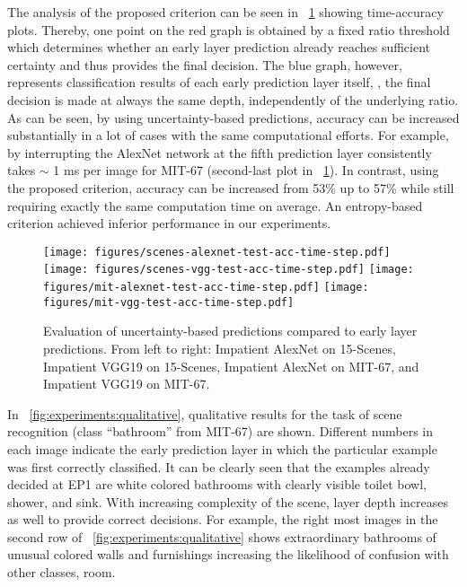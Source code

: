 \documentclass{bmvc2k}
\begin{document}
    The analysis of the proposed criterion can be seen in \figurename~\ref{fig:experiments:entropy} showing time-accuracy plots.
    Thereby, one point on the red graph is obtained by a fixed ratio threshold which determines whether an early layer prediction already reaches sufficient certainty and thus provides the final decision.
    The blue graph, however, represents classification results of each early prediction layer itself, \ie, the final decision is made at always the same depth, independently of the underlying ratio.
    As can be seen, by using uncertainty-based predictions, accuracy can be increased substantially in a lot of cases with the same computational efforts.
    For example, by interrupting the AlexNet network at the fifth prediction layer consistently takes $\sim$ 1 ms per image for MIT-67 (second-last plot in \figurename~\ref{fig:experiments:entropy}).
    In contrast, using the proposed criterion, accuracy can be increased from 53\% up to 57\% while still requiring exactly the same computation time on average.
    An entropy-based criterion achieved inferior performance in our experiments.
    
    \begin{figure}[tb]
        \centering
        \texttt{[image: figures/scenes-alexnet-test-acc-time-step.pdf]}
        \texttt{[image: figures/scenes-vgg-test-acc-time-step.pdf]} 
        \texttt{[image: figures/mit-alexnet-test-acc-time-step.pdf]}
        \texttt{[image: figures/mit-vgg-test-acc-time-step.pdf]} 
        \caption{
            Evaluation of uncertainty-based predictions compared to early layer predictions.
            From left to right: Impatient AlexNet on 15-Scenes, Impatient VGG19 on 15-Scenes, Impatient AlexNet on MIT-67, and Impatient VGG19 on MIT-67.
        }
        \label{fig:experiments:entropy}
    \end{figure}
    
    
    
    
    In \figurename~\ref{fig:experiments:qualitative}, qualitative results for the task of scene recognition (class ``bathroom'' from MIT-67) are shown.
    Different numbers in each image indicate the early prediction layer in which the particular example was first correctly classified.
    It can be clearly seen that the examples already decided at EP1 are white colored bathrooms with clearly visible toilet bowl, shower, and sink.
    With increasing complexity of the scene, layer depth increases as well to provide correct decisions.
    For example, the right most images in the second row of \figurename~\ref{fig:experiments:qualitative} shows extraordinary bathrooms of unusual colored walls and furnishings increasing the likelihood of confusion with other classes, \eg\children room.
    
\end{document}

